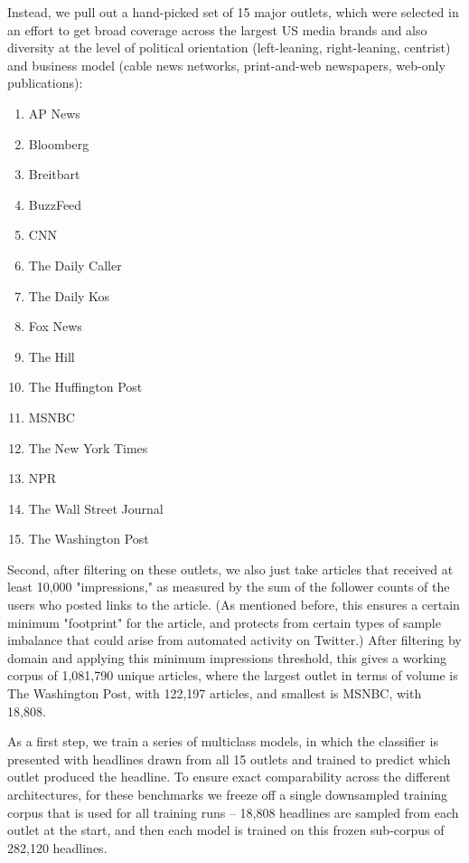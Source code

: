 \documentclass{scrartcl}
\begin{document}
Instead, we pull out a hand-picked set of 15 major outlets, which were selected in an effort to get broad coverage across the largest US media brands and also diversity at the level of political orientation (left-leaning, right-leaning, centrist) and business model (cable news networks, print-and-web newspapers, web-only publications):

\begin{enumerate}
  \item AP News
  \item Bloomberg
  \item Breitbart
  \item BuzzFeed
  \item CNN
  \item The Daily Caller
  \item The Daily Kos
  \item Fox News
  \item The Hill
  \item The Huffington Post
  \item MSNBC
  \item The New York Times
  \item NPR
  \item The Wall Street Journal
  \item The Washington Post
\end{enumerate}

Second, after filtering on these outlets, we also just take articles that received at least 10,000 "impressions," as measured by the sum of the follower counts of the users who posted links to the article. (As mentioned before, this ensures a certain minimum "footprint" for the article, and protects from certain types of sample imbalance that could arise from automated activity on Twitter.) After filtering by domain and applying this minimum impressions threshold, this gives a working corpus of 1,081,790 unique articles, where the largest outlet in terms of volume is The Washington Post, with 122,197 articles, and smallest is MSNBC, with 18,808.

As a first step, we train a series of multiclass models, in which the classifier is presented with headlines drawn from all 15 outlets and trained to predict which outlet produced the headline. To ensure exact comparability across the different architectures, for these benchmarks we freeze off a single downsampled training corpus that is used for all training runs -- 18,808 headlines are sampled from each outlet at the start, and then each model is trained on this frozen sub-corpus of 282,120 headlines.
\end{document}
